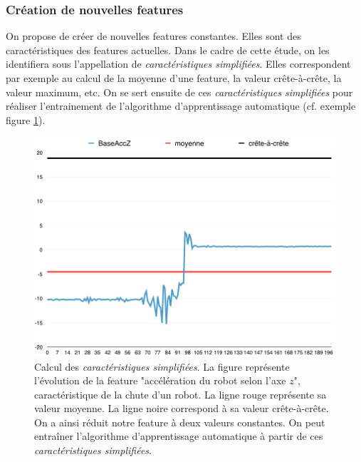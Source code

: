 \subsubsection{Création de nouvelles features}
\label{Automatisation du processus d'investigation: Reconnaissance de motifs: Différentes approches étudiées: Création de nouvelles features}
On propose de créer de nouvelles features constantes. Elles sont des caractéristiques des features actuelles. Dans le cadre de cette étude, on les identifiera sous l'appellation de \emph{caractéristiques simplifiées}. Elles correspondent par exemple au calcul de la moyenne d'une feature, la valeur crête-à-crête, la valeur maximum, etc. On se sert ensuite de ces  \emph{caractéristiques simplifiées} pour réaliser l'entrainement de l'algorithme d'apprentissage automatique (cf. exemple figure \ref{fig:Calcul de nouvelles features}).

\begin{figure}[h]
	\centering\includegraphics[width=12cm]{images/caracteristiques_simples_1.png}
	\caption[Calcul des caractéristiques simplifiées]{Calcul des \emph{caractéristiques simplifiées}. La figure représente l'évolution de la feature "accélération du robot selon l'axe $z$",  caractéristique de la chute d'un robot. La ligne rouge représente sa valeur moyenne. La ligne noire correspond à sa valeur crête-à-crête. On a ainsi réduit notre feature à deux valeurs constantes. On peut  entraîner l'algorithme d'apprentissage automatique à partir de ces \emph{caractéristiques simplifiées}.}
	\label{fig:Calcul de nouvelles features}
\end{figure}

